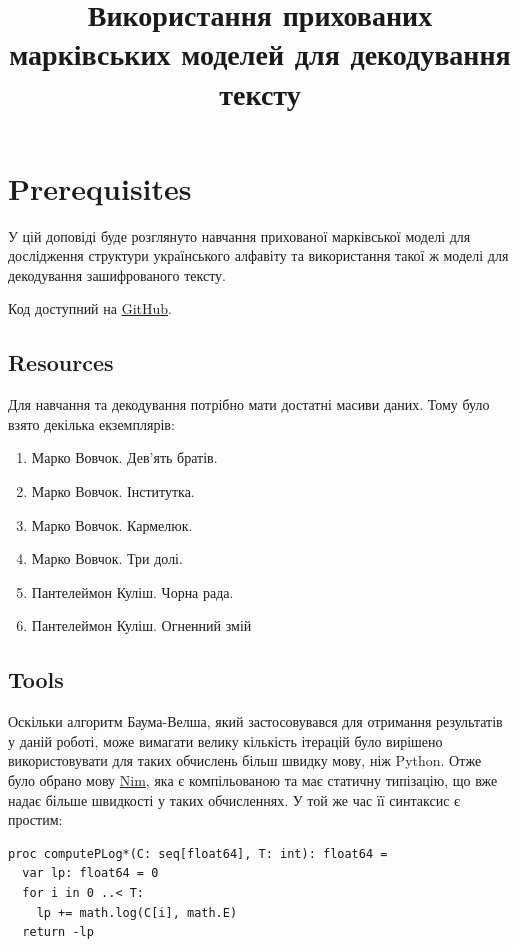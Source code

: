 \documentclass[12pt,a4paper]{article}
\title{Використання прихованих марківських моделей для декодування тексту}
\begin{document}
  \maketitle

  \section{Prerequisites}

  У цій доповіді буде розглянуто навчання прихованої марківської
  моделі для дослідження структури українського алфавіту та
  використання такої ж моделі для декодування зашифрованого тексту.

  Код доступний на \href{https://github.com/aipyth/markov_models}{GitHub}.

  \subsection{Resources}

  Для навчання та декодування потрібно мати достатні масиви даних.
  Тому було взято декілька екземплярів:
  \begin{enumerate}
    \item Марко Вовчок. Дев'ять братів.
    \item Марко Вовчок. Інститутка.
    \item Марко Вовчок. Кармелюк.
    \item Марко Вовчок. Три долі.
    \item Пантелеймон Куліш. Чорна рада.
    \item Пантелеймон Куліш. Огненний змій
  \end{enumerate}

  \subsection{Tools}
  Оскільки алгоритм Баума-Велша, який застосовувався для отримання
  результатів у даній роботі, може вимагати велику кількість ітерацій
  було вирішено використовувати для таких обчислень більш швидку мову,
  ніж Python. Отже було обрано мову \href{https://nim-lang.org/}{Nim},
  яка є компільованою та має статичну типізацію, що вже надає більше
  швидкості у таких обчисленнях. У той же час її синтаксис є простим:

  \begin{lstlisting}[caption=Nim example]
proc computePLog*(C: seq[float64], T: int): float64 =
  var lp: float64 = 0
  for i in 0 ..< T:
    lp += math.log(C[i], math.E)
  return -lp
  \end{lstlisting}
\end{document}
